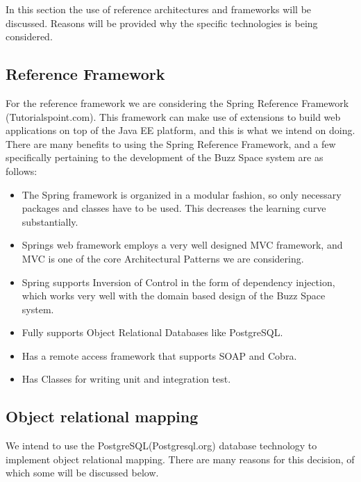 \begin{description}
\item In this section the use of reference architectures and frameworks will be discussed. Reasons will be provided why the specific technologies is being considered. 
\end{description}

\subsection{Reference Framework}

For the reference framework we are considering the Spring Reference Framework (Tutorialspoint.com). This framework can make use of extensions to build web applications on top of the Java EE platform, and this is what we intend on doing. There are many benefits to using the Spring Reference Framework, and a few specifically pertaining to the development of the Buzz Space system are as follows: 

\begin{itemize}
\item The Spring framework is organized in a modular fashion, so only necessary packages and classes have to be used. This decreases the learning curve substantially. 
\item Springs web framework employs a very well designed MVC framework, and MVC is one of the core Architectural Patterns we are considering. 
\item Spring supports Inversion of Control in the form of dependency injection, which works very well with the domain based design of the Buzz Space system. 
\item Fully supports Object Relational Databases like PostgreSQL. 
\item Has a remote access framework that supports SOAP and Cobra.
\item Has Classes for writing unit and integration test. 
\end{itemize}

\subsection{Object relational mapping}

We intend to use the PostgreSQL(Postgresql.org) database technology to implement object relational mapping. There are many reasons for this decision, of which some will be discussed below.

